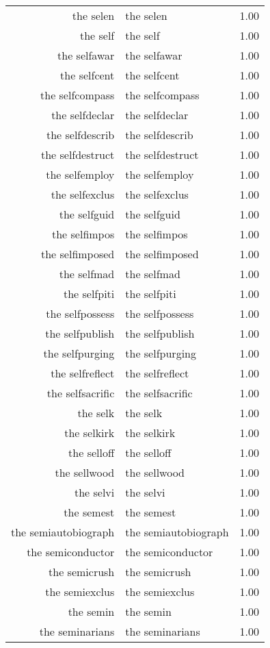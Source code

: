 \begin{table}[ht]
\begin{tabular}{rlr}
  the selen & the selen & 1.00 \\ 
  the self & the self & 1.00 \\ 
  the selfawar & the selfawar & 1.00 \\ 
  the selfcent & the selfcent & 1.00 \\ 
  the selfcompass & the selfcompass & 1.00 \\ 
  the selfdeclar & the selfdeclar & 1.00 \\ 
  the selfdescrib & the selfdescrib & 1.00 \\ 
  the selfdestruct & the selfdestruct & 1.00 \\ 
  the selfemploy & the selfemploy & 1.00 \\ 
  the selfexclus & the selfexclus & 1.00 \\ 
  the selfguid & the selfguid & 1.00 \\ 
  the selfimpos & the selfimpos & 1.00 \\ 
  the selfimposed & the selfimposed & 1.00 \\ 
  the selfmad & the selfmad & 1.00 \\ 
  the selfpiti & the selfpiti & 1.00 \\ 
  the selfpossess & the selfpossess & 1.00 \\ 
  the selfpublish & the selfpublish & 1.00 \\ 
  the selfpurging & the selfpurging & 1.00 \\ 
  the selfreflect & the selfreflect & 1.00 \\ 
  the selfsacrific & the selfsacrific & 1.00 \\ 
  the selk & the selk & 1.00 \\ 
  the selkirk & the selkirk & 1.00 \\ 
  the selloff & the selloff & 1.00 \\ 
  the sellwood & the sellwood & 1.00 \\ 
  the selvi & the selvi & 1.00 \\ 
  the semest & the semest & 1.00 \\ 
  the semiautobiograph & the semiautobiograph & 1.00 \\ 
  the semiconductor & the semiconductor & 1.00 \\ 
  the semicrush & the semicrush & 1.00 \\ 
  the semiexclus & the semiexclus & 1.00 \\ 
  the semin & the semin & 1.00 \\ 
  the seminarians & the seminarians & 1.00 \\ 

\end{tabular}
\end{table}
